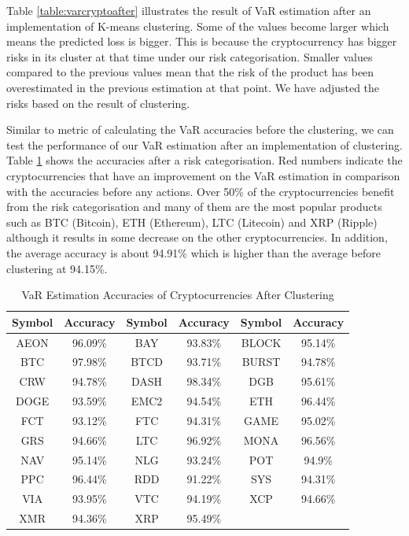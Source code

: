\documentclass[11pt]{article} %
\theoremstyle{plain}
\theoremstyle{definition}
\begin{document}
Table \ref{table:varcryptoafter} illustrates the result of VaR estimation after an implementation of K-means clustering. Some of the values become larger which means the predicted loss is bigger. This is because the cryptocurrency has bigger risks in its cluster at that time under our risk categorisation. Smaller values compared to the previous values mean that the risk of the product has been overestimated in the previous estimation at that point. We have adjusted the risks based on the result of clustering.

Similar to metric of calculating the VaR accuracies before the clustering, we can test the performance of our VaR estimation after an implementation of clustering. Table \ref{table:acccryptoafter} shows the accuracies after a risk categorisation. Red numbers indicate the cryptocurrencies that have an improvement on the VaR estimation in comparison with the accuracies before any actions. Over 50\% of the cryptocurrencies benefit from the risk categorisation and many of them are the most popular products such as BTC (Bitcoin), ETH (Ethereum), LTC (Litecoin) and XRP (Ripple) although it results in some decrease on the other cryptocurrencies. In addition, the average accuracy is about 94.91\% which is higher than the average before clustering at 94.15\%.

{
  \begin{table}[ht]
    \centering
    \small
    \begin{tabular}{|c|c|c|c|c|c|}
        \hline
        Symbol & Accuracy & Symbol & Accuracy & Symbol & Accuracy \\
        \hline
        AEON & \color{red}96.09\% & BAY & 93.83\% & BLOCK & \color{red}95.14\% \\
        BTC & \color{red}97.98\% & BTCD & 93.71\% & BURST & \color{red}94.78\% \\
        CRW & 94.78\% & DASH & \color{red}98.34\% & DGB & \color{red}95.61\% \\
        DOGE & 93.59\% & EMC2 & 94.54\% & ETH & \color{red}96.44\% \\
        FCT & 93.12\% & FTC & 94.31\% & GAME & \color{red}95.02\% \\
        GRS & \color{red}94.66\% & LTC & \color{red}96.92\% & MONA & \color{red}96.56\% \\
        NAV & \color{red}95.14\% & NLG & 93.24\% & POT & \color{red}94.9\% \\
        PPC & \color{red}96.44\% & RDD & 91.22\% & SYS & \color{red}94.31\% \\
        VIA & 93.95\% & VTC & \color{red}94.19\% & XCP & \color{red}94.66\% \\
        XMR & 94.36\% & XRP & \color{red}95.49\% & & \\
        \hline
    \end{tabular}
    \caption{VaR Estimation Accuracies of Cryptocurrencies After Clustering}
    \label{table:acccryptoafter}
  \end{table}
}
\end{document}
